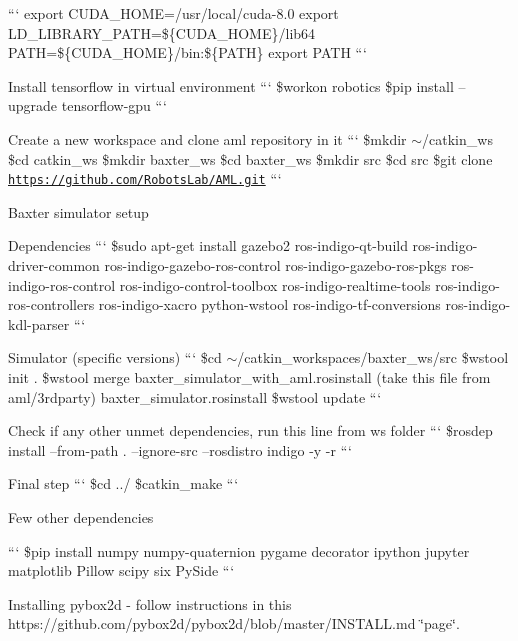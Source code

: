 \begin{DoxyEnumerate}
\begin{DoxyItemize}
``` export C\+U\+D\+A\+\_\+\+H\+O\+ME=/usr/local/cuda-\/8.0 export L\+D\+\_\+\+L\+I\+B\+R\+A\+R\+Y\+\_\+\+P\+A\+TH=\$\{C\+U\+D\+A\+\_\+\+H\+O\+ME\}/lib64 P\+A\+TH=\$\{C\+U\+D\+A\+\_\+\+H\+O\+ME\}/bin\+:\$\{P\+A\+TH\} export P\+A\+TH ```
\end{DoxyItemize}
\item Install tensorflow in virtual environment ``` \$workon robotics \$pip install --upgrade tensorflow-\/gpu ```
\item Create a new workspace and clone aml repository in it ``` \$mkdir $\sim$/catkin\+\_\+ws \$cd catkin\+\_\+ws \$mkdir baxter\+\_\+ws \$cd baxter\+\_\+ws \$mkdir src \$cd src \$git clone \href{https://github.com/RobotsLab/AML.git}{\tt https\+://github.\+com/\+Robots\+Lab/\+A\+M\+L.\+git} ```
\item Baxter simulator setup
\begin{DoxyItemize}
\item Dependencies ``` \$sudo apt-\/get install gazebo2 ros-\/indigo-\/qt-\/build ros-\/indigo-\/driver-\/common ros-\/indigo-\/gazebo-\/ros-\/control ros-\/indigo-\/gazebo-\/ros-\/pkgs ros-\/indigo-\/ros-\/control ros-\/indigo-\/control-\/toolbox ros-\/indigo-\/realtime-\/tools ros-\/indigo-\/ros-\/controllers ros-\/indigo-\/xacro python-\/wstool ros-\/indigo-\/tf-\/conversions ros-\/indigo-\/kdl-\/parser ```
\item Simulator (specific versions) ``` \$cd $\sim$/catkin\+\_\+workspaces/baxter\+\_\+ws/src \$wstool init . \$wstool merge baxter\+\_\+simulator\+\_\+with\+\_\+aml.\+rosinstall (take this file from aml/3rdparty) baxter\+\_\+simulator.\+rosinstall \$wstool update ```
\end{DoxyItemize}
\end{DoxyEnumerate}

Check if any other unmet dependencies, run this line from ws folder ``` \$rosdep install --from-\/path . --ignore-\/src --rosdistro indigo -\/y -\/r ```


\begin{DoxyItemize}
\item Final step ``` \$cd ../ \$catkin\+\_\+make ```
\end{DoxyItemize}

Few other dependencies

``` \$pip install numpy numpy-\/quaternion pygame decorator ipython jupyter matplotlib Pillow scipy six Py\+Side ```


\begin{DoxyEnumerate}
\item Installing pybox2d -\/ follow instructions in this https\+://github.com/pybox2d/pybox2d/blob/master/\+I\+N\+S\+T\+A\+L\+L.\+md \char`\"{}page\char`\"{}.
\end{DoxyEnumerate}

